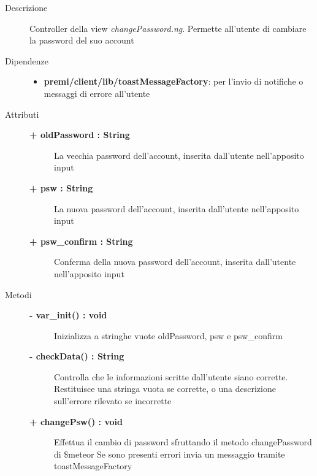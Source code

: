 \begin{description}
\item[Descrizione] \hfill
	Controller della view \textit{changePassword.ng}. Permette all'utente di cambiare la password del suo account
	
	
	
\item[Dipendenze] \hfill
	\begin{itemize}
		\item \textbf{premi/client/lib/toastMessageFactory}: per l'invio di notifiche o messaggi di errore all'utente
	\end{itemize}
	
	
\item[Attributi] \hfill
	\begin{description}
		\item[\textbf{+ oldPassword : String			}] \hfill
			La vecchia password dell'account, inserita dall'utente nell'apposito input
		\item[\textbf{+ psw : String			}] \hfill
			La nuova password dell'account, inserita dall'utente nell'apposito input
		\item[\textbf{+ psw\_confirm : String			}] \hfill
			Conferma della nuova password dell'account, inserita dall'utente nell'apposito input
	\end{description}
	
	
\item[Metodi] \hfill

	\begin{description}
		\item[\textbf{\color{blue}- var\_init() : void			}] \hfill
			Inizializza a stringhe vuote oldPassword, psw e psw\_confirm
	\end{description}
	
	\begin{description}
		\item[\textbf{\color{blue}- checkData() : String			}] \hfill
			Controlla che le informazioni scritte dall'utente siano corrette. Restituisce una stringa vuota se corrette, o una descrizione sull'errore rilevato se incorrette
	\end{description}
	
	\begin{description}
		\item[\textbf{\color{blue}+ changePsw() : void			}] \hfill
			Effettua il cambio di password sfruttando il metodo changePassword di \$meteor
			Se sono presenti errori invia un messaggio tramite toastMessageFactory
	\end{description}

\end{description}


